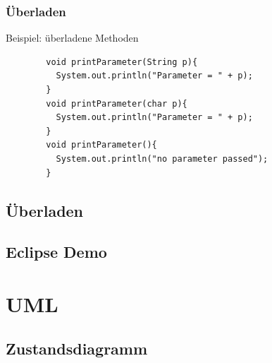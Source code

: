 \begin{frame}[fragile]
\frametitle{Überladen}
	\begin{block}{Beispiel: überladene Methoden}
	\begin{lstlisting}
		void printParameter(String p){
		  System.out.println("Parameter = " + p);
		}
		void printParameter(char p){
		  System.out.println("Parameter = " + p);
		}
		void printParameter(){
		  System.out.println("no parameter passed");
		}
	\end{lstlisting}
	\end{block}
\end{frame}


\subsection{Überladen}


\subsection{Eclipse Demo}


\section{UML}
\subsection{Zustandsdiagramm}


